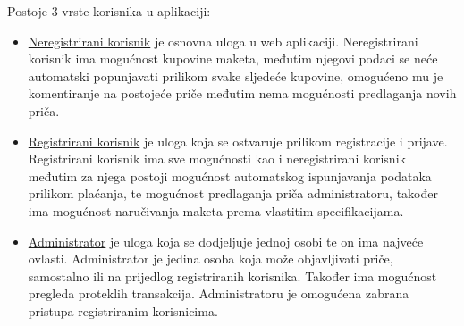 		Postoje 3 vrste korisnika u aplikaciji:
		\begin{itemize}
			\item \underline{Neregistrirani korisnik} je osnovna uloga u web aplikaciji. Neregistrirani korisnik ima mogućnost kupovine maketa, međutim njegovi podaci se neće automatski popunjavati prilikom svake sljedeće kupovine, omogućeno mu je komentiranje na postojeće priče međutim nema mogućnosti predlaganja novih priča.
			\item \underline{Registrirani korisnik} je uloga koja se ostvaruje prilikom registracije i prijave. Registrirani korisnik ima sve mogućnosti kao i neregistrirani korisnik međutim za njega postoji mogućnost automatskog ispunjavanja podataka prilikom plaćanja, te mogućnost predlaganja priča administratoru, također ima mogućnost naručivanja maketa prema vlastitim specifikacijama.
			\item \underline{Administrator} je uloga koja se dodjeljuje jednoj osobi te on ima najveće ovlasti. Administrator je jedina osoba koja može objavljivati priče, samostalno ili na prijedlog registriranih korisnika. Također ima mogućnost pregleda proteklih transakcija. Administratoru je omogućena zabrana pristupa registriranim korisnicima.
		\end{itemize}